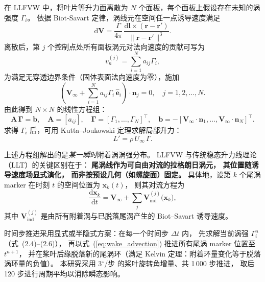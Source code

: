 在 LLFVW 中，将叶片等升力面离散为 $N$ 个面板，每个面板上假设存在未知的涡强度 $\Gamma_i$。
依据 Biot-Savart 定律，涡线元在空间任一点诱导速度满足
\begin{equation}
\mathrm{d}\mathbf{V} = \frac{\Gamma}{4\pi}\,\frac{\mathrm{d}\mathbf{l} \times (\mathbf{r} - \mathbf{r}')}{\|\mathbf{r} - \mathbf{r}'\|^3}.
\end{equation}
离散后，第 $j$ 个控制点处所有面板涡元对法向速度的贡献可写为
\begin{equation}
v_n^{(j)} = \sum_{i=1}^{N} a_{ij} \Gamma_i,
\end{equation}
为满足无穿透边界条件（固体表面法向速度为零），施加
\begin{equation}
\left(\mathbf{V}_\infty + \sum_{i=1}^{N} a_{ij} \Gamma_i\,\hat{\mathbf{e}}_i\right)\cdot \mathbf{n}_j = 0, \quad j = 1,2,\dots,N.
\end{equation}
由此得到 $N \times N$ 的线性方程组：
\begin{equation}
\mathbf{A}\,\boldsymbol{\Gamma} = \mathbf{b}, \quad \mathbf{A} = [a_{ij}], \quad \boldsymbol{\Gamma} = [\Gamma_1, \dots, \Gamma_N]^{\top}, \quad \mathbf{b} = -[\mathbf{V}_\infty \cdot \mathbf{n}_1, \dots, \mathbf{V}_\infty \cdot \mathbf{n}_N]^{\top}.
\end{equation}
求得 $\Gamma_i$ 后，可用 Kutta--Joukowski 定理求解局部升力：
\begin{equation}
L' = \rho\,U_\infty\,\Gamma.
\end{equation}

上述方程组解出的是\emph{某一瞬时}附着涡涡强分布。
LLFVW 与传统稳态升力线理论（LLT）的关键区别在于：
\textbf{尾涡线作为可自由对流的拉格朗日涡元，
其位置随诱导速度场显式演化，
而非按预设几何（如螺旋面）固定。}
具体地，设第 $k$ 个尾涡 marker 在时刻 $t$ 的空间位置为 $\mathbf{x}_k(t)$，
则其对流方程为
\begin{equation}
\frac{\mathrm{d}\mathbf{x}_k}{\mathrm{d}t} = \mathbf{V}_\infty + \sum_{j} \mathbf{V}_{\text{ind}}^{(j)}\!\bigl(\mathbf{x}_k\bigr),
\label{eq:wake_advection}
\end{equation}
其中 $\mathbf{V}_{\text{ind}}^{(j)}$ 是由所有附着涡与已脱落尾涡产生的 Biot--Savart 诱导速度。

时间步推进采用显式或半隐式方案：在每一个时间步 $\Delta t$ 内，
先求解当前涡强 $\Gamma_i^{n}$（式~(2.4)--(2.6)），
再以式~(\ref{eq:wake_advection}) 推进所有尾涡 marker 位置至 $t^{n+1}$，
并在桨叶后缘脱落新的尾涡环（满足 Kelvin 定理：附着环量变化等于脱落涡环量的负值）。
本研究采用 3$^\circ$/步 的桨叶旋转角增量、共 1\,000 步推进，
取后 120 步进行周期平均以消除瞬态影响。

